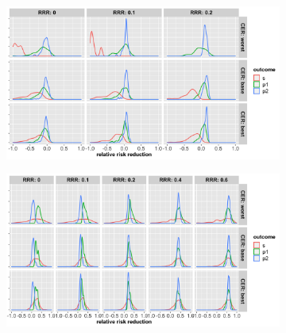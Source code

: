 \documentclass[]{article}
\begin{document}
\begin{figure}
\centering
  \caption{Distribution of relative risk reduction estimates after stopping early for (a) futility; (b) superiority.
  Results are presented for the three control event rates by rows, relative risk reductions (by columns) and the
  three outcomes (legend).}
  \begin{subfigure}{0.8\textwidth}
    \centering
    \caption{}
    \includegraphics{../p1_plots/batch_size_nb_3000/RRRhat_fut_p1.png}
  \end{subfigure}
  \bigbreak
  \begin{subfigure}{0.8\textwidth}
    \centering
    \caption{}
    \includegraphics{../p1_plots/batch_size_nb_3000/RRRhat_sup_p1.png}
  \end{subfigure}
\end{figure}
\end{document}
